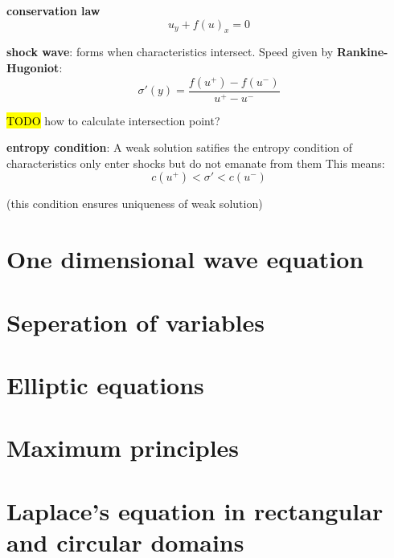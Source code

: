 \textbf{conservation law}
$$u_y + f(u)_x = 0$$

\textbf{shock wave}: forms when characteristics intersect. Speed given by \textbf{Rankine-Hugoniot}:
$$\sigma'(y) = \frac{f(u^+) - f(u^-)}{u^+ - u^-}$$

\hl{TODO} how to calculate intersection point?

\textbf{entropy condition}: A weak solution satifies the entropy condition of characteristics only enter shocks but do not emanate from them This means:
$$c(u^+) < \sigma' < c(u^-)$$

(this condition ensures uniqueness of weak solution)

\section{One dimensional wave equation}

\section{Seperation of variables}

\section{Elliptic equations}

\section{Maximum principles}

\section{Laplace's equation in rectangular and circular domains}
